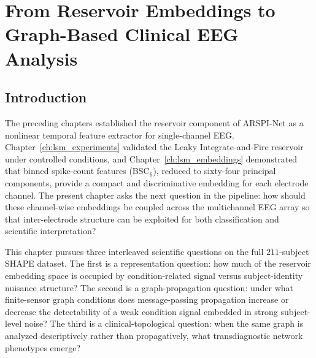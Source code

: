 
\chapter{From Reservoir Embeddings to Graph-Based Clinical EEG Analysis}
\label{chap:arspi_net}

\section{Introduction}
\label{sec:ch5_intro}

The preceding chapters established the reservoir component of ARSPI-Net as a nonlinear temporal feature extractor for single-channel EEG. Chapter~\ref{ch:lsm_experiments} validated the Leaky Integrate-and-Fire reservoir under controlled conditions, and Chapter~\ref{ch:lsm_embeddings} demonstrated that binned spike-count features (BSC$_6$), reduced to sixty-four principal components, provide a compact and discriminative embedding for each electrode channel. The present chapter asks the next question in the pipeline: how should these channel-wise embeddings be coupled across the multichannel EEG array so that inter-electrode structure can be exploited for both classification and scientific interpretation?

This chapter pursues three interleaved scientific questions on the full $211$-subject SHAPE dataset. The first is a representation question: how much of the reservoir embedding space is occupied by condition-related signal versus subject-identity nuisance structure? The second is a graph-propagation question: under what finite-sensor graph conditions does message-passing propagation increase or decrease the detectability of a weak condition signal embedded in strong subject-level noise? The third is a clinical-topological question: when the same graph is analyzed descriptively rather than propagatively, what transdiagnostic network phenotypes emerge?

